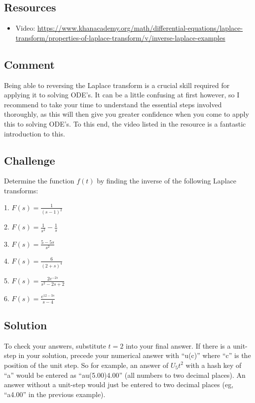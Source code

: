 \subsection*{Resources}
\begin{itemize}
    \item Video: \url{https://www.khanacademy.org/math/differential-equations/laplace-transform/properties-of-laplace-transform/v/inverse-laplace-examples} %
\end{itemize}

\subsection*{Comment}
Being able to reversing the Laplace transform is a crucial skill required for applying it to solving ODE's. It can be a little confusing at first however, so I recommend to take your time to understand the essential steps involved thoroughly, as this will then give you greater confidence when you come to apply this to solving ODE's. To this end, the video listed in the resource is a fantastic introduction to this.

\subsection*{Challenge}
Determine the function $f(t)$ by finding the inverse of the following Laplace transforms:

1. $\displaystyle F(s)=\frac{1}{(s-1)^2}$

2. $\displaystyle F(s)=\frac{1}{s^2} - \frac{1}{s}$


3. $\displaystyle F(s)=\frac{5-5s}{s^2}$

4. $\displaystyle F(s)=\frac{6}{(2+s)^4}$


5. $\displaystyle F(s)=\frac{2 e^{-2s}}{s^2-2s+2}$

6. $\displaystyle F(s)=\frac{e^{12-3s}}{s-4}$

\subsection*{Solution}
To check your answers, substitute $t=2$ into your final answer. If there is a unit-step in your solution, precede your numerical answer with ``u(c)'' where ``c'' is the position of the unit step. So for example, an answer of $U_5 t^2$ with a hash key of ``a'' would be entered as ``au(5.00)4.00'' (all numbers to two decimal places). An answer without a unit-step would just be entered to two decimal places (eg, ``a4.00'' in the previous example).

